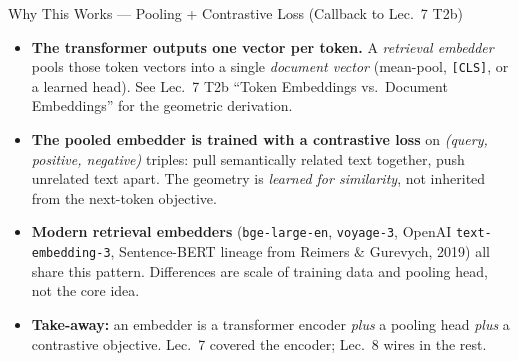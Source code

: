 \begin{frame}{Why This Works --- Pooling + Contrastive Loss (Callback to Lec.\ 7 T2b)}
\begin{itemize}
\item \textbf{The transformer outputs one vector per token.} A \emph{retrieval embedder} pools those token vectors into a single \emph{document vector} (mean-pool, \texttt{[CLS]}, or a learned head). See Lec.\ 7 T2b ``Token Embeddings vs.\ Document Embeddings'' for the geometric derivation.

\medskip
\item \textbf{The pooled embedder is trained with a contrastive loss} on \emph{(query, positive, negative)} triples: pull semantically related text together, push unrelated text apart. The geometry is \emph{learned for similarity}, not inherited from the next-token objective.

\medskip
\item \textbf{Modern retrieval embedders} (\texttt{bge-large-en}, \texttt{voyage-3}, OpenAI \texttt{text-embedding-3}, Sentence-BERT lineage from Reimers \& Gurevych, 2019) all share this pattern. Differences are scale of training data and pooling head, not the core idea.

\medskip
\item \textbf{Take-away:} an embedder is a transformer encoder \emph{plus} a pooling head \emph{plus} a contrastive objective. Lec.\ 7 covered the encoder; Lec.\ 8 wires in the rest.
\end{itemize}
\end{frame}

